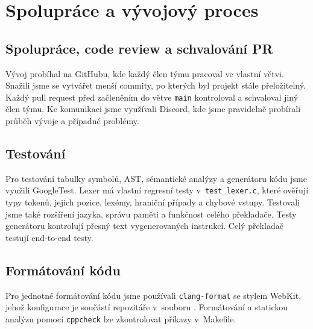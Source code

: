 \section{Spolupráce a vývojový proces}\label{sec:spoluprace}

\subsection{Spolupráce, code review a schvalování PR}
Vývoj probíhal na GitHubu, kde každý člen týmu pracoval ve vlastní větvi.
Snažili jsme se vytvářet menší commity, po kterých byl projekt stále
přeložitelný. Každý pull request před začleněním do větve \texttt{main}
kontroloval a schvaloval jiný člen týmu. Ke komunikaci jsme využívali
Discord, kde jsme pravidelně probírali průběh vývoje a případné problémy.

\subsection{Testování}
Pro testování tabulky symbolů, AST, sémantické analýzy a generátoru kódu
jsme využili GoogleTest. Lexer má vlastní regresní testy v~\texttt{test\_lexer.c}, které
ověřují typy tokenů, jejich pozice, lexémy, hraniční případy a chybové
vstupy. Testovali jsme také rozšíření jazyka, správu paměti a funkčnost
celého překladače. Testy generátoru kontrolují přesný text vygenerovaných
instrukcí. Celý překladač testují end-to-end testy.

\subsection{Formátování kódu}
Pro jednotné formátování kódu jsme používali \texttt{clang-format} se stylem
WebKit, jehož konfigurace je součástí repozitáře v~souboru
. Formátování a statickou analýzu pomocí
\texttt{cppcheck} lze zkontrolovat příkazy v~Makefile.

